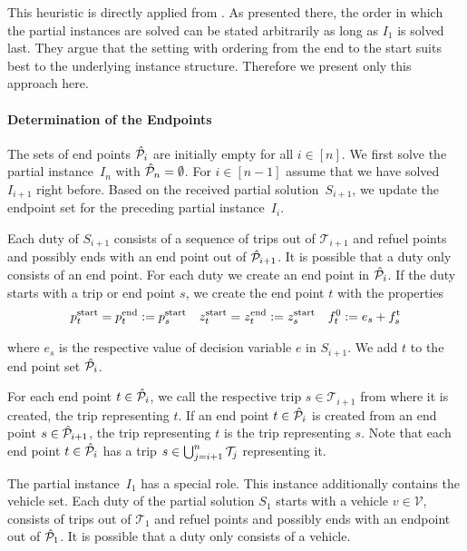 This heuristic is directly applied from \cite[Sec.~10.4]{Knoll}. As presented there, the order in which the partial instances are solved can be stated arbitrarily as long as $I_1$ is solved last. They argue that the setting with ordering from the end to the start suits best to the underlying instance structure. Therefore we present only this approach here.

\paragraph{Determination of the Endpoints} \parfill

The sets of end points $\hat{\mathcal{P}}_i$ are initially empty for all $i\in[n]$. We first solve the partial instance~$I_n$ with ${\hat{\mathcal{P}}_n = \emptyset}$. For ${i\in[n-1]}$ assume that we have solved $I_{i+1}$ right before. Based on the received partial solution~$S_{i+1}$, we update the endpoint set for the preceding partial instance~$I_i$.

Each duty of $S_{i+1}$ consists of a sequence of trips out of $\mathcal{T}_{i+1}$ and refuel points and possibly ends with an end point out of $\hat{\mathcal{P}}_{i+1}$. It is possible that a duty only consists of an end point. For each duty we create an end point in $\hat{\mathcal{P}}_i$. If the duty starts with a trip or end point $s$, we create the end point $t$ with the properties
\begin{align*}
	p^{\operatorname{start}}_t = p^{\operatorname{end}}_t := p^{\operatorname{start}}_s && z^{\operatorname{start}}_t = z^{\operatorname{end}}_t := z^{\operatorname{start}}_s && f_t^0 := e_s + f^{\operatorname{t}}_s
\end{align*}

where $e_s$ is the respective value of decision variable $e$ in $S_{i+1}$. We add $t$ to the end point set $\hat{\mathcal{P}}_i$.

For each end point $t\in\hat{\mathcal{P}}_i$, we call the respective trip $s\in\mathcal{T}_{i+1}$ from where it is created, the trip representing $t$. If an end point $t\in\hat{\mathcal{P}}_i$ is created from an end point $s\in\hat{\mathcal{P}}_{i+1}$, the trip representing $t$ is the trip representing $s$. Note that each end point $t\in\hat{\mathcal{P}}_i$ has a trip ${s\in\bigcup_{j=i+1}^n\mathcal{T}_j}$ representing it.

The partial instance~$I_1$ has a special role. This instance additionally contains the vehicle set. Each duty of the partial solution $S_1$ starts with a vehicle $v\in\mathcal{V}$, consists of trips out of $\mathcal{T}_1$ and refuel points and possibly ends with an endpoint out of $\hat{\mathcal{P}}_1$. It is possible that a duty only consists of a vehicle.


